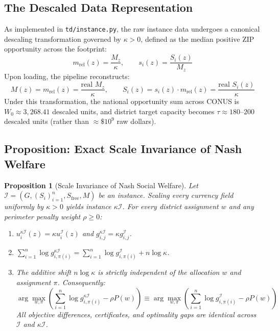 \documentclass[11pt,a4paper]{article}
\theoremstyle{plain}
\newtheorem{proposition}{Proposition}
\theoremstyle{definition}
\begin{document}
\subsection{The Descaled Data Representation}
As implemented in \texttt{td/instance.py}, the raw instance data undergoes a canonical descaling transformation governed by $\kappa > 0$, defined as the median positive ZIP opportunity across the footprint:
\begin{equation}
    m_{\text{rel}}(z) = \frac{M_z}{\kappa}, \qquad s_i(z) = \frac{S_i(z)}{M_z}
\end{equation}
Upon loading, the pipeline reconstructs:
\begin{equation}
    M(z) = m_{\text{rel}}(z) = \frac{\text{real } M_z}{\kappa}, \qquad S_i(z) = s_i(z) \cdot m_{\text{rel}}(z) = \frac{\text{real } S_i(z)}{\kappa}
\end{equation}
Under this transformation, the national opportunity sum across CONUS is $W_0 \approx 3,268.41$ descaled units, and district target capacity becomes $\tau \approx 180\text{--}200$ descaled units (rather than $\approx \$10^9$ raw dollars).

\subsection{Proposition: Exact Scale Invariance of Nash Welfare}
\begin{proposition}[Scale Invariance of Nash Social Welfare]\label{prop:scale}
Let $\mathcal{I} = (G, (S_i)_{i=1}^n, S_{\text{free}}, M)$ be an instance. Scaling every currency field uniformly by $\kappa > 0$ yields instance $\kappa \mathcal{I}$. For every district assignment $w$ and any perimeter penalty weight $\rho \ge 0$:
\begin{enumerate}[leftmargin=1.5em]
    \item $u_i^{\kappa \mathcal{I}}(z) = \kappa u_i^{\mathcal{I}}(z)$ and $g_{i,j}^{\kappa \mathcal{I}} = \kappa g_{i,j}^{\mathcal{I}}$.
    \item $\sum_{i=1}^n \log g_{i, \pi(i)}^{\kappa \mathcal{I}} = \sum_{i=1}^n \log g_{i, \pi(i)}^{\mathcal{I}} + n \log \kappa$.
    \item The additive shift $n \log \kappa$ is strictly independent of the allocation $w$ and assignment $\pi$. Consequently:
    \begin{equation}
    \arg\max_{w, \pi} \left( \sum_{i=1}^n \log g_{i, \pi(i)}^{\kappa \mathcal{I}} - \rho P(w) \right) \equiv \arg\max_{w, \pi} \left( \sum_{i=1}^n \log g_{i, \pi(i)}^{\mathcal{I}} - \rho P(w) \right)
    \end{equation}
    All objective differences, certificates, and optimality gaps are identical across $\mathcal{I}$ and $\kappa \mathcal{I}$.
\end{enumerate}
\end{proposition}
\end{document}
